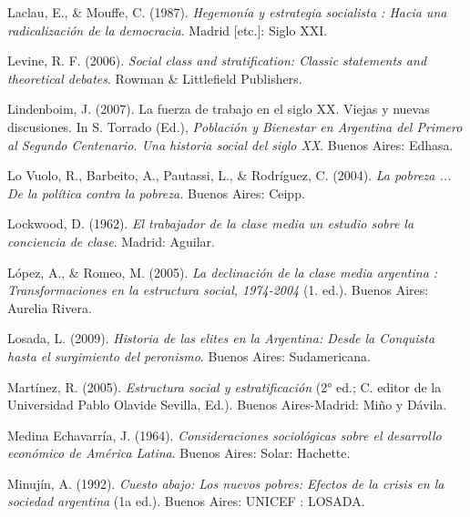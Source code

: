 \documentclass[
]{article}
\newlength{\cslhangindent}
\newlength{\cslentryspacingunit} %
\newenvironment{CSLReferences}[2] %
 {%
  \setlength{\parindent}{0pt}
  \ifodd #1
  \let\oldpar\par
  \def\par{\hangindent=\cslhangindent\oldpar}
  \fi
  \setlength{\parskip}{#2\cslentryspacingunit}
 }%
 {}
\begin{document}
\begin{CSLReferences}{1}{0}
\leavevmode{}%
Laclau, E., \& Mouffe, C. (1987). \emph{Hegemonía y estrategia socialista : Hacia una radicalización de la democracia}. Madrid {[}etc.{]}: Siglo XXI.

\leavevmode{}%
Levine, R. F. (2006). \emph{Social class and stratification: Classic statements and theoretical debates}. Rowman \& Littlefield Publishers.

\leavevmode{}%
Lindenboim, J. (2007). La fuerza de trabajo en el siglo {XX}. {Viejas} y nuevas discusiones. In S. Torrado (Ed.), \emph{Población y {Bienestar} en {Argentina} del {Primero} al {Segundo} {Centenario}. {Una} historia social del siglo {XX}}. Buenos Aires: Edhasa.

\leavevmode{}%
Lo Vuolo, R., Barbeito, A., Pautassi, L., \& Rodríguez, C. (2004). \emph{La pobreza ... De la política contra la pobreza.} Buenos Aires: Ceipp.

\leavevmode{}%
Lockwood, D. (1962). \emph{El trabajador de la clase media un estudio sobre la conciencia de clase}. Madrid: Aguilar.

\leavevmode{}%
López, A., \& Romeo, M. (2005). \emph{La declinación de la clase media argentina : Transformaciones en la estructura social, 1974-2004} (1. ed.). Buenos Aires: Aurelia Rivera.

\leavevmode{}%
Losada, L. (2009). \emph{Historia de las elites en la {Argentina}: Desde la {Conquista} hasta el surgimiento del peronismo}. Buenos Aires: Sudamericana.

\leavevmode{}%
Martínez, R. (2005). \emph{Estructura social y estratificación} (2° ed.; C. editor de la Universidad Pablo Olavide Sevilla, Ed.). Buenos Aires-Madrid: Miño y Dávila.

\leavevmode{}%
Medina Echavarría, J. (1964). \emph{Consideraciones sociológicas sobre el desarrollo económico de {América} {Latina}}. Buenos Aires: Solar: Hachette.

\leavevmode{}%
Minujín, A. (1992). \emph{Cuesto abajo: Los nuevos pobres: Efectos de la crisis en la sociedad argentina} (1a ed.). Buenos Aires: UNICEF : LOSADA.


\end{CSLReferences}
\end{document}

